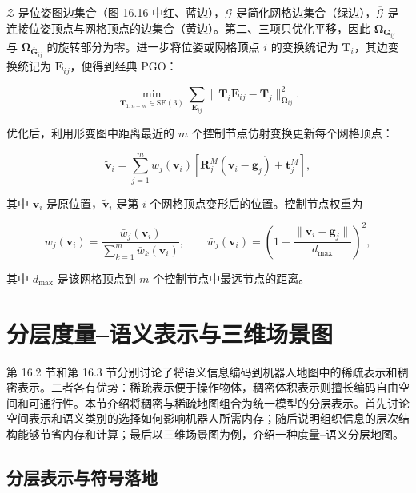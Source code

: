 $\mathcal{Z}$ 是位姿图边集合（图 16.16 中红、蓝边），$\mathcal{G}$ 是简化网格边集合（绿边），$\overline{\mathcal{G}}$ 是连接位姿顶点与网格顶点的边集合（黄边）。第二、三项只优化平移，因此 $\boldsymbol{\Omega}_{\boldsymbol{G}_{ij}}$ 与 $\boldsymbol{\Omega}_{\overline{\boldsymbol{G}}_{ij}}$ 的旋转部分为零。进一步将位姿或网格顶点 $i$ 的变换统记为 $\boldsymbol{T}_i$，其边变换统记为 $\boldsymbol{E}_{ij}$，便得到经典 PGO：

\begin{equation}
\min_{\boldsymbol{T}_{1:n+m}\in\mathrm{SE}(3)}
\sum_{\boldsymbol{E}_{ij}}\|\boldsymbol{T}_i\boldsymbol{E}_{ij}-\boldsymbol{T}_j\|_{\boldsymbol{\Omega}_{ij}}^{2}.\tag{16.31}
\end{equation}

优化后，利用形变图中距离最近的 $m$ 个控制节点仿射变换更新每个网格顶点：

\begin{equation}
\tilde{\boldsymbol{v}}_i=\sum_{j=1}^{m}w_j(\boldsymbol{v}_i)
[\boldsymbol{R}_j^M(\boldsymbol{v}_i-\boldsymbol{g}_j)+\boldsymbol{t}_j^M],\tag{16.32}
\end{equation}

其中 $\boldsymbol{v}_i$ 是原位置，$\tilde{\boldsymbol{v}}_i$ 是第 $i$ 个网格顶点变形后的位置。控制节点权重为

\begin{equation}
w_j(\boldsymbol{v}_i)=\frac{\bar{w}_j(\boldsymbol{v}_i)}{\sum_{k=1}^{m}\bar{w}_k(\boldsymbol{v}_i)},\qquad
\bar{w}_j(\boldsymbol{v}_i)=\left(1-\frac{\|\boldsymbol{v}_i-\boldsymbol{g}_j\|}{d_{\max}}\right)^2,\tag{16.33}
\end{equation}

其中 $d_{\max}$ 是该网格顶点到 $m$ 个控制节点中最远节点的距离。

\section{分层度量--语义表示与三维场景图}

第 16.2 节和第 16.3 节分别讨论了将语义信息编码到机器人地图中的稀疏表示和稠密表示。二者各有优势：稀疏表示便于操作物体，稠密体积表示则擅长编码自由空间和可通行性。本节介绍将稠密与稀疏地图组合为统一模型的分层表示。首先讨论空间表示和语义类别的选择如何影响机器人所需内存；随后说明组织信息的层次结构能够节省内存和计算；最后以三维场景图为例，介绍一种度量--语义分层地图。

\subsection{分层表示与符号落地}

